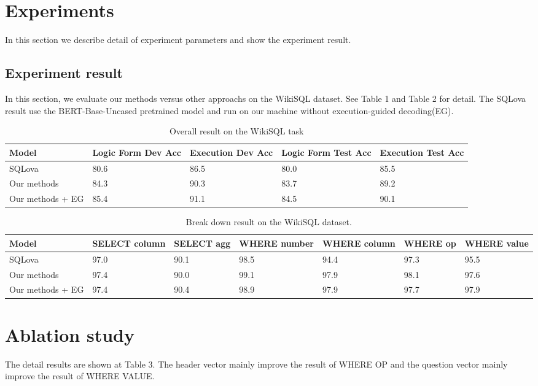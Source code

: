 \documentclass{llncs}
\begin{document}
\section{Experiments}

In this section we describe detail of experiment parameters and show the experiment result.

\subsection{Experiment result}

In this section, we evaluate our methods versus other approachs on the WikiSQL dataset. See Table 1 and Table 2 for detail. The SQLova\cite{ref_proc3} result use the BERT-Base-Uncased pretrained model and run on our machine without execution-guided decoding(EG)\cite{ref_proc6}.


\begin{table}
\caption{Overall result on the WikiSQL task}\label{tab1}
\centering
\begin{tabular}{|l|l|l|l|l|}
\hline
Model & Logic Form Dev Acc & Execution Dev Acc & Logic Form Test Acc & Execution Test Acc\\
\hline
SQLova\cite{ref_proc3} & 80.6 & 86.5 & 80.0 & 85.5 \\ 
\hline
Our methods & 84.3 & 90.3 & 83.7 & 89.2 \\ 
\hline
Our methods + EG & 85.4 & 91.1 & 84.5 & 90.1 \\ 
\hline
\end{tabular}
\end{table}


\begin{table}
\caption{Break down result on the WikiSQL dataset.}\label{tab1}
\centering
\begin{tabular}{|l|l|l|l|l|l|l|}
\hline
Model & SELECT column & SELECT agg & WHERE number & WHERE column & WHERE op & WHERE value\\
\hline
SQLova\cite{ref_proc3} & 97.0 & 90.1 & 98.5 & 94.4& 97.3 & 95.5 \\ 
\hline
Our methods & 97.4 & 90.0 & 99.1 & 97.9 & 98.1 &97.6\\
\hline
Our methods + EG & 97.4 & 90.4 & 98.9 & 97.9 & 97.7 &97.9\\
\hline
\end{tabular}
\end{table}

\section{Ablation study}
The detail results are shown at Table 3. The header vector mainly improve the result of WHERE OP and the question vector mainly improve the result of WHERE VALUE.
\end{document}
